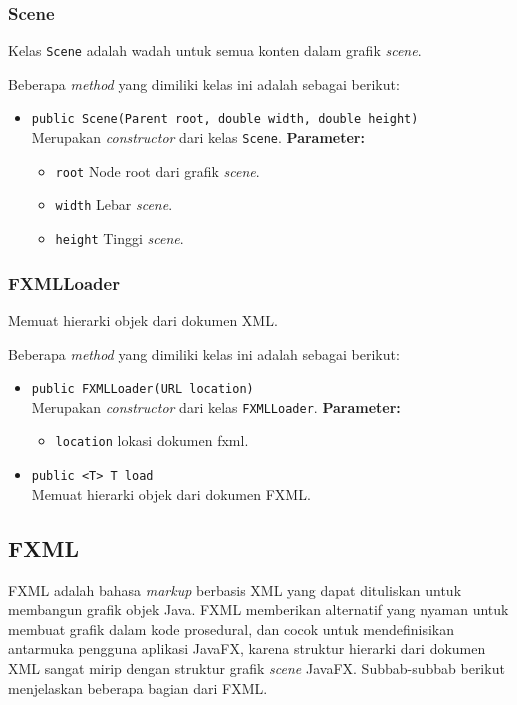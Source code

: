 \subsubsection{Scene}
Kelas \texttt{Scene} adalah wadah untuk semua konten dalam grafik \textit{scene}. 

Beberapa \textit{method} yang dimiliki kelas ini adalah sebagai berikut:
\begin{itemize}
	\item \texttt{public Scene(Parent root, double width, double height)}\\
    Merupakan \textit{constructor} dari kelas \texttt{Scene}.
    \textbf{Parameter:}
	\begin{itemize}
		\item \texttt{root} Node root dari grafik \textit{scene}.
		\item \texttt{width} Lebar \textit{scene}.
		\item \texttt{height} Tinggi \textit{scene}.
	\end{itemize}
\end{itemize}


\subsubsection{FXMLLoader}
Memuat hierarki objek dari dokumen XML.

Beberapa \textit{method} yang dimiliki kelas ini adalah sebagai berikut:
\begin{itemize}
	\item \texttt{public FXMLLoader(URL location)}\\
    Merupakan \textit{constructor} dari kelas \texttt{FXMLLoader}.
	\textbf{Parameter:}
	\begin{itemize}
		\item \texttt{location} lokasi dokumen fxml.
	\end{itemize}
	
	\item \texttt{public <T> T load}\\
	Memuat hierarki objek dari dokumen FXML.
\end{itemize}

\subsection{FXML}
FXML adalah bahasa \textit{markup} berbasis XML yang dapat dituliskan untuk membangun grafik objek Java. FXML memberikan alternatif yang nyaman untuk membuat grafik dalam kode prosedural, dan cocok untuk mendefinisikan antarmuka pengguna aplikasi JavaFX, karena struktur hierarki dari dokumen XML sangat mirip dengan struktur grafik \textit{scene} JavaFX. \cite{javafx} Subbab-subbab berikut menjelaskan beberapa bagian dari FXML.


